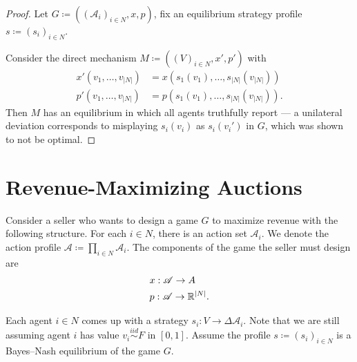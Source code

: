 \begin{proof}
	Let $G \coloneqq \left( \left( \mathscr{A}_i \right)_{i \in N},x,p \right)$, fix an equilibrium strategy profile $s \coloneqq \left( s_i \right)_{i \in N}$. 

	Consider the direct mechanism $M \coloneqq \left( \left( V \right)_{i \in N}, x',p' \right)$ with
	\begin{align*}
		x'(v_1,\ldots,v_{\left| N \right|}) &= x\left( s_1(v_1),\ldots,s_{\left| N \right|}\left( v_{\left| N \right|} \right) \right) \\
		p'(v_1,\ldots,v_{\left| N \right|}) &= p\left( s_1(v_1),\ldots,s_{\left| N \right|}\left( v_{\left| N \right|} \right) \right)
	.\end{align*}
	Then $M$ has an equilibrium in which all agents truthfully report --- a unilateral deviation corresponds to misplaying $s_i(v_i)$ as $s_i(v_i')$ in $G$, which was shown to not be optimal.
\end{proof}

\section{Revenue-Maximizing Auctions}

Consider a seller who wants to design a game $G$ to maximize revenue with the following structure. For each $i \in N$, there is an action set $\mathscr{A}_i$. We denote the action profile $\mathscr{A} \coloneqq \prod_{i \in N}^{} \mathscr{A}_i $. 
The components of the game the seller must design are 
\begin{align*}
	&x: \mathscr{A} \to A \\
	&p: \mathscr{A} \to \mathbb{R}^{\left| N \right|}
.\end{align*}

Each agent $i \in N$ comes up with a strategy $s_i : V \to \Delta \mathscr{A}_i$. Note that we are still assuming agent $i$ has value $v_i \overset{iid}{\sim} F$ in $[0,1]$. Assume the profile $s\coloneqq \left( s_i \right)_{i \in N}$ is a Bayes--Nash equilibrium of the game $G$.

